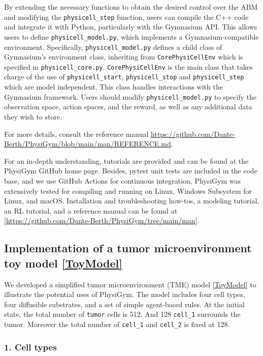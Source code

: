 \documentclass{article}
\begin{document}
By extending the necessary functions to obtain the desired control over the ABM and modifying the \texttt{physicell\_step} function, users can compile the C++ code and integrate it with Python, particularly with the Gymnasium API. This allows users to define \texttt{physicell\_model.py}, which implements a Gymnasium-compatible environment. Specifically, \texttt{physicell\_model.py} defines a child class of Gymnasium’s environment class, inheriting from \texttt{CorePhysiCellEnv} which is specified in \texttt{physicell\_core.py}.
\texttt{CorePhysiCellEnv} is the main class that takes charge of the use of \texttt{physicell\_start}, \texttt{physicell\_stop} and \texttt{physicell\_step} which are model independent.
This class handles interactions with the Gymnasium framework. 
Users should modify \texttt{physicell\_model.py} to specify the observation space, action spaces, and the reward, as well as any additional data they wish to store.

For more details, consult the reference manual \url{https://github.com/Dante-Berth/PhysiGym/blob/main/man/REFERENCE.md}.

For an in-depth understanding, tutorials are provided and can be found at the PhysiGym GitHub home page.
Besides, pytest unit tests are included in the code base, and we use GitHub Actions for continuous integration.
PhysiGym was extensively tested for compiling and running on Linux, Windows Subsystem for Linux, and macOS. 
Installation and troubleshooting how-tos, a modeling tutorial, an RL tutorial, and a reference manual can be found at [\url{https://github.com/Dante-Berth/PhysiGym/tree/main/man}].


\subsection{Implementation of a tumor microenvironment toy model \ref{ToyModel}}

We developed a simplified tumor microenvironment (TME) model \ref{ToyModel} to illustrate the potential uses of PhysiGym. The model includes four cell types, four diffusible substrates, and a set of simple agent-based rules.
At the initial state, the total number of \texttt{tumor} cells is 512. And 128 \texttt{cell\_1} surrounds the tumor.
Moreover the total number of \texttt{cell\_1} and \texttt{cell\_2} is fixed at 128. 
\subsubsection*{1. Cell types}
\end{document}
